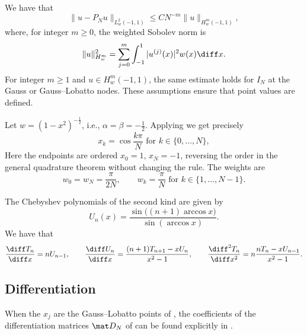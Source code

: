 We have that
\begin{equation*}
    \|u - P_N u\|_{L^2_w (-1,1)} \le C N^{-m} \| u \|_{H^m_w (-1,1)},
\end{equation*}
where, for integer $m\ge0$, the weighted Sobolev norm is
\begin{equation*}
    \|u\|_{H^m_w}^2=\sum_{j=0}^m\int_{-1}^1|u^{(j)}(x)|^2w(x)\diff x.
\end{equation*}
For integer $m\ge1$ and $u\in H^m_w(-1,1)$, the same estimate holds for $I_N$ at the Gauss or Gauss--Lobatto nodes. These assumptions ensure that point values are defined.

\begin{example}
    \label{ex:Chebyshev Gauss-Lobatto}
    Let $w = (1 - x^2)^{-\frac 1 2}$, i.e., $\alpha = \beta = -\frac 1 2$.
    Applying  we get precisely
    \begin{equation*}
        x_k = \cos \frac{k \pi}{N} \text{ for } k \in \{0, \dots, N \},
    \end{equation*}
    Here the endpoints are ordered $x_0=1$, $x_N=-1$, reversing the order in the general quadrature theorem without changing the rule. The weights are
    \begin{equation*}
        w_0 = w_N = \frac{\pi}{2N}, \qquad w_k = \frac{\pi}N \text{ for } k \in \{1, \dots, N-1\}.
    \end{equation*}
\end{example}

The Chebyshev polynomials of the second kind are given by
\begin{equation*}
    U_n (x) = \frac{\sin \big( (n+1) \arccos x \big)}{\sin \left( \arccos x \right)}.
\end{equation*}
We have that
\begin{equation}
    \label{eq:Chebyshev derivatives}
    \frac{\diff T_n}{\diff x} = n U_{n-1}, \qquad \frac{\diff U_n}{\diff x} = \frac{(n+1) T_{n+1} - x U_n}{x^2 - 1}, \qquad \frac{\diff^2T_n}{\diff x^2} = n \frac{n T_n - x U_{n-1}}{x^2 - 1}.
\end{equation}

\subsection{Differentiation}

When the $x_j$ are the Gauss--Lobatto points of , the coefficients of the differentiation matrices $\mat D_N$ of  can be found explicitly in \cite[Section 2.4]{CanutoHussainiQuarteroniZang2011}.
